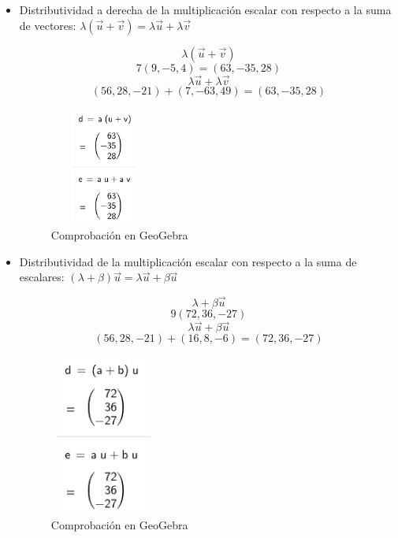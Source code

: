 \begin{itemize}
    \FloatBarrier
    \item Distributividad a derecha de la multiplicación escalar con respecto a la suma de vectores: \(\lambda(\vec{u}+\vec{v})=\lambda\vec{u}+\lambda\vec{v}\)
    
    \[
        \lambda(\vec{u}+\vec{v})
    \]
    \[
        7(9,-5,4)=(63,-35,28)
    \]
    \[
        \lambda\vec{u}+\lambda\vec{v}
    \]
    \[
        (56,28,-21)+(7,-63,49)=(63,-35,28)
    \]
    \begin{figure}[ht!]
        \centering
        \includegraphics[width=100pt,height=110pt]{img/imagen8.png}
        \caption{Comprobación en GeoGebra}
    \end{figure}

    \FloatBarrier
    \item Distributividad de la multiplicación escalar con respecto a la suma de escalares: \((\lambda+\beta)\vec{u}=\lambda\vec{u}+\beta\vec{u}\)
    
    \[
        \lambda+\beta\vec{u}
    \]
    \[
        9(72,36,-27)
    \]
    \[
        \lambda\vec{u}+\beta\vec{u}
    \]
    \[
        (56,28,-21)+(16,8,-6)=(72,36,-27)
    \]
    \begin{figure}[ht!]
        \centering
        \includegraphics[width=100pt,height=150pt]{img/imagen9.png}
        \caption{Comprobación en GeoGebra}
    \end{figure}
\end{itemize}